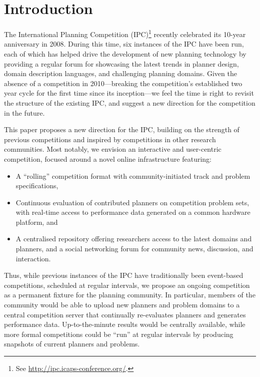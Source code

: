 \section{Introduction}
\label{sec:introduction}


The International Planning Competition (IPC)\footnote{See
\url{http://ipc.icaps-conference.org/}.} recently celebrated its 10-year
anniversary in 2008. During this time, six instances of the IPC have been
run, each of which has helped drive the development of new planning
technology by providing a regular forum for showcasing the latest trends
in planner design, domain description languages, and challenging planning
domains. Given the absence of a competition in 2010---breaking the
competition's established two year cycle for the first time since its
inception---we feel the time is right to revisit the structure of the
existing IPC, and suggest a new direction for the competition in the
future.

This paper proposes a new direction for the IPC, building on the strength
of previous competitions and inspired by competitions in other research
communities. Most notably, we envision an interactive and user-centric
competition, focused around a novel online infrastructure featuring:
%
\begin{itemize}
\item A ``rolling'' competition format with community-initiated track and
problem specifications,

\item Continuous evaluation of contributed planners on competition
problem sets, with real-time access to performance data generated on a
common hardware platform, and

\item A centralised repository offering researchers access to the latest
domains and planners, and a social networking forum for community news,
discussion, and interaction.
\end{itemize}

Thus, while previous instances of the IPC have traditionally been
event-based competitions, scheduled at regular intervals, we propose an
ongoing competition as a permanent fixture for the planning community. In
particular, members of the community would be able to upload new planners
and problem domains to a central competition server that continually
re-evaluates planners and generates performance data. Up-to-the-minute
results would be centrally available, while more formal competitions could
be ``run'' at regular intervals by producing snapshots of current planners
and problems. 

